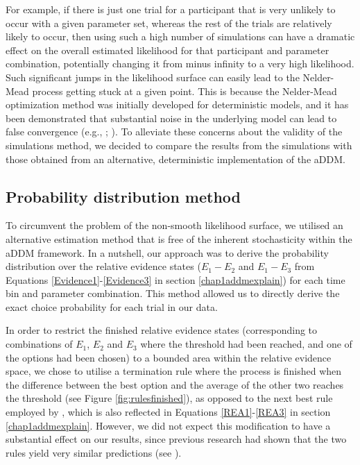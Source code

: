 \documentclass[11pt,a4paper]{article}
\begin{document}
For example, if there is just one trial for a participant that is very unlikely to occur with a given parameter set, whereas the rest of the trials are relatively likely to occur, then using such a high number of simulations can have a dramatic effect on the overall estimated likelihood for that participant and parameter combination, potentially changing it from minus infinity to a very high likelihood. Such significant jumps in the likelihood surface can easily lead to the Nelder-Mead process getting stuck at a given point. This is because the Nelder-Mead optimization method was initially developed for deterministic models, and it has been demonstrated that substantial noise in the underlying model can lead to false convergence (e.g., ; ). To alleviate these concerns about the validity of the simulations method, we decided to compare the results from the simulations with those obtained from an alternative, deterministic implementation of the aDDM.


\subsection{Probability distribution method}

To circumvent the problem of the non-smooth likelihood surface, we utilised an alternative estimation method that is free of the inherent stochasticity within the aDDM framework. In a nutshell, our approach was to derive the probability distribution over the relative evidence states ($E_{1}-E_{2}$ and $E_{1}-E_{3}$ from Equations \ref{Evidence1}-\ref{Evidence3} in section \ref{chap1addmexplain}) for each time bin and parameter combination. This method allowed us to directly derive the exact choice probability for each trial in our data.

In order to restrict the finished relative evidence states (corresponding to combinations of $E_{1}$, $E_{2}$ and $E_{3}$ where the threshold had been reached, and one of the options had been chosen) to a bounded area within the relative evidence space, we chose to utilise a termination rule where the process is finished when the difference between the best option and the average of the other two reaches the threshold (see Figure \ref{fig:rulesfinished}), as opposed to the next best rule employed by , which is also reflected in Equations \ref{REA1}-\ref{REA3} in section \ref{chap1addmexplain}. However, we did not expect this modification to have a substantial effect on our results, since previous research had shown that the two rules yield very similar predictions (see ).
\end{document}
